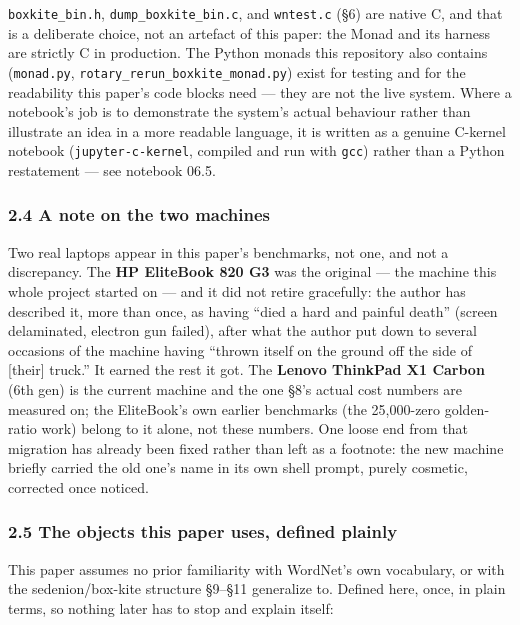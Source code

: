 \documentclass[
  10pt,
]{article}
\begin{document}
\texttt{boxkite\_bin.h}, \texttt{dump\_boxkite\_bin.c}, and
\texttt{wntest.c} (§6) are native C, and that is a deliberate choice,
not an artefact of this paper: the Monad and its harness are strictly C
in production. The Python monads this repository also contains
(\texttt{monad.py}, \texttt{rotary\_rerun\_boxkite\_monad.py}) exist for
testing and for the readability this paper's code blocks need --- they
are not the live system. Where a notebook's job is to demonstrate the
system's actual behaviour rather than illustrate an idea in a more
readable language, it is written as a genuine C-kernel notebook
(\texttt{jupyter-c-kernel}, compiled and run with \texttt{gcc}) rather
than a Python restatement --- see notebook 06.5.

\hypertarget{a-note-on-the-two-machines}{%
\subsubsection{2.4 A note on the two
machines}\label{a-note-on-the-two-machines}}

Two real laptops appear in this paper's benchmarks, not one, and not a
discrepancy. The \textbf{HP EliteBook 820 G3} was the original --- the
machine this whole project started on --- and it did not retire
gracefully: the author has described it, more than once, as having
``died a hard and painful death'' (screen delaminated, electron gun
failed), after what the author put down to several occasions of the
machine having ``thrown itself on the ground off the side of {[}their{]}
truck.'' It earned the rest it got. The \textbf{Lenovo ThinkPad X1
Carbon} (6th gen) is the current machine and the one §8's actual cost
numbers are measured on; the EliteBook's own earlier benchmarks (the
25,000-zero golden-ratio work) belong to it alone, not these numbers.
One loose end from that migration has already been fixed rather than
left as a footnote: the new machine briefly carried the old one's name
in its own shell prompt, purely cosmetic, corrected once noticed.

\hypertarget{the-objects-this-paper-uses-defined-plainly}{%
\subsubsection{2.5 The objects this paper uses, defined
plainly}\label{the-objects-this-paper-uses-defined-plainly}}

This paper assumes no prior familiarity with WordNet's own vocabulary,
or with the sedenion/box-kite structure §9--§11 generalize to. Defined
here, once, in plain terms, so nothing later has to stop and explain
itself:
\end{document}
